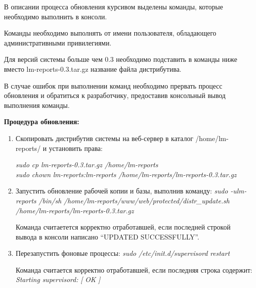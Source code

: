 В описании процесса обновления курсивом выделены команды, которые необходимо выполнить в консоли.

Команды необходимо выполнять от имени пользователя, обладающего административными привилегиями.

Для версий системы больше чем 0.3 необходимо подставить в команды ниже вместо lm-reports-0.3.tar.gz название файла дистрибутива.

В случае ошибок при выполнении команд необходимо прервать процесс обновления и обратиться к разработчику, предоставив консольный вывод выполнения команды.

\textbf{Процедура обновления:}
\begin{enumerate}
\item{
Скопировать дистрибутив системы на веб-сервер в каталог /home/lm-reports/ и установить права:

\textit{sudo cp lm-reports-0.3.tar.gz /home/lm-reports\\
sudo chown lm-reports:lm-reports /home/lm-reports/lm-reports-0.3.tar.gz
}
}
\item{
Запустить обновление рабочей копии и базы, выполнив команду:
\textit{sudo -ulm-reports /bin/sh /home/lm-reports/www/web/protected/distr\_update.sh /home/lm-reports/lm-reports-0.3.tar.gz}

Команда считаетется корректно отработавшей, если последней строкой вывода в консоли написано “UPDATED SUCCESSFULLY”.

}
\item{
Перезапустить фоновые процессы:
\textit{sudo /etc/init.d/supervisord restart}

Команда считается корректно отработавшей, если последняя строка содержит:
\textit{Starting supervisord:                                      [  OK  ]}
}
\end{enumerate}
